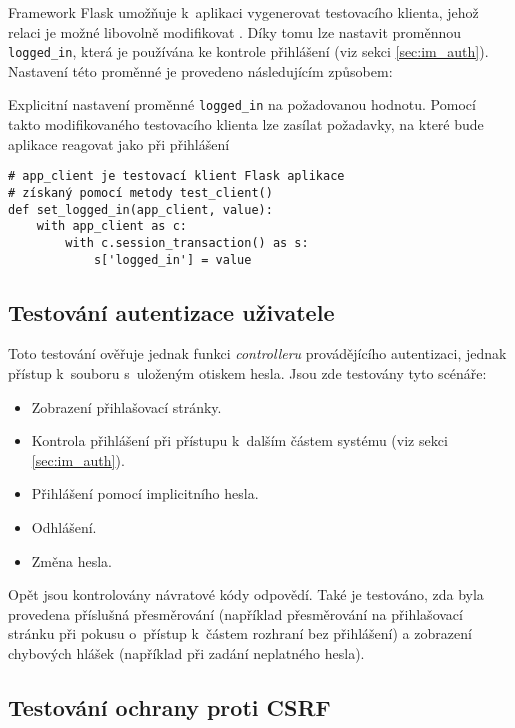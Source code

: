 Framework Flask umožňuje k~aplikaci vygenerovat testovacího klienta, jehož relaci je možné libovolně modifikovat \cite{flask_testing}. Díky tomu lze nastavit proměnnou \texttt{logged\_in}, která je používána ke kontrole přihlášení (viz sekci \ref{sec:im_auth}). Nastavení této proměnné je provedeno následujícím způsobem:

\begin{listing}[htbp]
\caption{\label{lst:logged_in} Explicitní nastavení proměnné \texttt{logged\_in} na požadovanou hodnotu. Pomocí takto modifikovaného testovacího klienta lze zasílat požadavky, na které bude aplikace reagovat jako při přihlášení}
\begin{verbatim}
# app_client je testovací klient Flask aplikace
# získaný pomocí metody test_client()
def set_logged_in(app_client, value):
    with app_client as c:
        with c.session_transaction() as s:
            s['logged_in'] = value
\end{verbatim}
\end{listing}

\subsection{Testování autentizace uživatele}

Toto testování ověřuje jednak funkci \textit{controlleru} provádějícího autentizaci, jednak přístup k~souboru s~uloženým otiskem hesla. Jsou zde testovány tyto scénáře:

\begin{itemize}
    \item Zobrazení přihlašovací stránky.
    \item Kontrola přihlášení při přístupu k~dalším částem systému (viz sekci \ref{sec:im_auth}).
    \item Přihlášení pomocí implicitního hesla.
    \item Odhlášení.
    \item Změna hesla.
\end{itemize}

Opět jsou kontrolovány návratové kódy odpovědí. Také je testováno, zda byla provedena příslušná přesměrování (například přesměrování na přihlašovací stránku při pokusu o~přístup k~částem rozhraní bez přihlášení) a zobrazení chybových hlášek (například při zadání neplatného hesla).

\subsection{Testování ochrany proti CSRF}
\label{sec:te_csrf}

